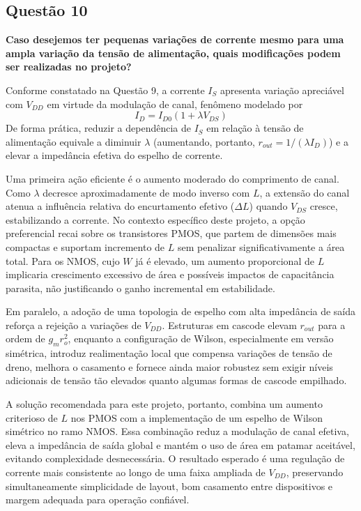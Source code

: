 \documentclass[12pt,a4paper]{article}
\begin{document}
\subsection*{Questão 10}
\begin{BoxQ}
	\textbf{Caso desejemos ter pequenas variações de corrente mesmo para uma ampla variação da tensão de alimentação, quais modificações podem ser realizadas no projeto?}
\end{BoxQ}

Conforme constatado na Questão 9, a corrente $I_S$ apresenta variação apreciável com $V_{DD}$ em virtude da modulação de canal, fenômeno modelado por
\begin{equation}
I_D = I_{D0}\left(1 + \lambda V_{DS}\right)
\end{equation}
De forma prática, reduzir a dependência de $I_S$ em relação à tensão de alimentação equivale a diminuir $\lambda$ (aumentando, portanto, $r_{out} = 1/(\lambda I_D)$) e a elevar a impedância efetiva do espelho de corrente.

Uma primeira ação eficiente é o aumento moderado do comprimento de canal. Como $\lambda$ decresce aproximadamente de modo inverso com $L$, a extensão do canal atenua a influência relativa do encurtamento efetivo ($\Delta L$) quando $V_{DS}$ cresce, estabilizando a corrente. No contexto específico deste projeto, a opção preferencial recai sobre os transistores PMOS, que partem de dimensões mais compactas e suportam incremento de $L$ sem penalizar significativamente a área total. Para os NMOS, cujo $W$ já é elevado, um aumento proporcional de $L$ implicaria crescimento excessivo de área e possíveis impactos de capacitância parasita, não justificando o ganho incremental em estabilidade.

Em paralelo, a adoção de uma topologia de espelho com alta impedância de saída reforça a rejeição a variações de $V_{DD}$. Estruturas em cascode elevam $r_{out}$ para a ordem de $g_m r_o^2$, enquanto a configuração de Wilson, especialmente em versão simétrica, introduz realimentação local que compensa variações de tensão de dreno, melhora o casamento e fornece ainda maior robustez sem exigir níveis adicionais de tensão tão elevados quanto algumas formas de cascode empilhado.

A solução recomendada para este projeto, portanto, combina um aumento criterioso de $L$ nos PMOS com a implementação de um espelho de Wilson simétrico no ramo NMOS. Essa combinação reduz a modulação de canal efetiva, eleva a impedância de saída global e mantém o uso de área em patamar aceitável, evitando complexidade desnecessária. O resultado esperado é uma regulação de corrente mais consistente ao longo de uma faixa ampliada de $V_{DD}$, preservando simultaneamente simplicidade de layout, bom casamento entre dispositivos e margem adequada para operação confiável.
\end{document}
